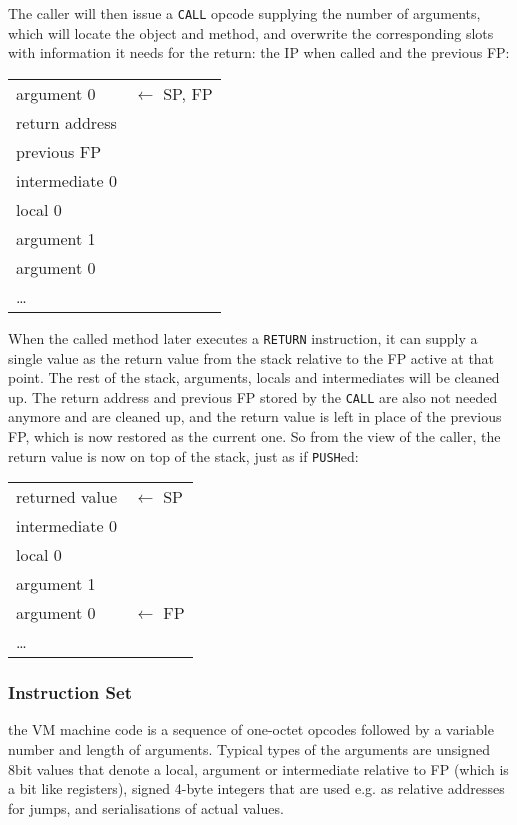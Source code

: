 \documentclass[12pt,a4paper]{article}
\begin{document}
The caller will then issue a \verb|CALL| opcode supplying the number of arguments, which will locate the object and method, and overwrite the corresponding slots with information it needs for the return: the IP when called and the previous FP:

\begin{table}[H]
\centering
\begin{tabular}{|p{3cm}|p{3cm}}
argument 0 & $\leftarrow$ SP, FP \\
\cline{1-1}
return address \\
previous FP \\
intermediate 0 \\
local 0    \\    
argument 1 \\
argument 0 \\
\cline{1-1}
\ldots & \\
\end{tabular}
\end{table}

When the called method later executes a \verb|RETURN| instruction, it can supply a single value as the return value from the stack relative to the FP active at that point. The rest of the stack, arguments, locals and intermediates will be cleaned up. The return address and previous FP stored by the \verb|CALL| are also not needed anymore and are cleaned up, and the return value is left in place of the previous FP, which is now restored as the current one. So from the view of the caller, the return value is now on top of the stack, just as if \verb|PUSH|ed:

\begin{table}[H]
\centering
\begin{tabular}{|p{3cm}|p{3cm}}
returned value & $\leftarrow$ SP \\
intermediate 0 \\
local 0    \\    
argument 1 \\
argument 0 & $\leftarrow$ FP \\ 
\cline{1-1}
\ldots & \\
\end{tabular}
\end{table}

\subsubsection{Instruction Set}\label{sec:instructionset}

the VM machine code is a sequence of one-octet opcodes followed by a variable number and length of arguments. Typical types of the arguments are unsigned 8bit values that denote a local, argument or intermediate relative to FP (which is a bit like registers), signed 4-byte integers that are used e.g. as relative addresses for jumps, and serialisations of actual values.
\end{document}
